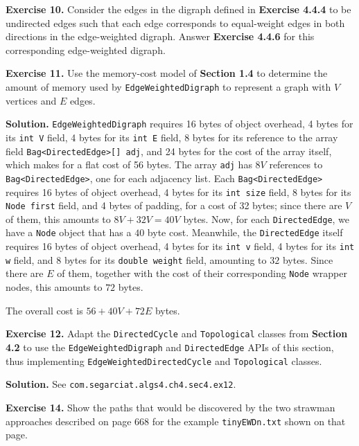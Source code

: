\documentclass[12pt, a4paper]{article}
\newenvironment{ex}[2][Exercise]
{\par\medskip\noindent \textbf{#1 #2.}}
{\medskip}
\newenvironment{sol}[1][Solution]
{\par\medskip\noindent \textbf{#1.} }
{\medskip}
\begin{document}
	\begin{ex}{10}
		Consider the edges in the digraph defined in \textbf{Exercise 4.4.4} to be undirected
		edges such that each edge corresponds to equal-weight edges in both directions
		in the edge-weighted digraph. Answer \textbf{Exercise 4.4.6} for this corresponding
		edge-weighted digraph.
	\end{ex}
	\begin{ex}{11}
		Use the memory-cost model of \textbf{Section 1.4} to determine the amount of memory
		used by \texttt{EdgeWeightedDigraph} to represent a graph with $V$ vertices and
		$E$ edges.
	\end{ex}
	\begin{sol}
		\texttt{EdgeWeightedDigraph} requires 16 bytes of object overhead, 4 bytes
		for its \texttt{int V} field, 4 bytes for its \texttt{int E} field,
		8 bytes for its reference to the array field \texttt{Bag<DirectedEdge>[] adj},
		and 24 bytes for the cost of the array itself, which makes for a flat cost of 56 bytes.
		The array \texttt{adj} has $8V$ references to \texttt{Bag<DirectedEdge>}, one for each
		adjacency list. Each \texttt{Bag<DirectedEdge>} requires 16 bytes of object
		overhead, 4 bytes for its \texttt{int size} field, 8 bytes for its \texttt{Node first}
		field, and 4 bytes of padding, for a cost of 32 bytes; since there are $V$ of them,
		this amounts to $8V+32V=40V$ bytes. Now, for each \texttt{DirectedEdge}, we have
		a \texttt{Node} object that has a $40$ byte cost. Meanwhile, the \texttt{DirectedEdge}
		itself requires 16 bytes of object overhead, 4 bytes for its \texttt{int v} field,
		4 bytes for its \texttt{int w} field, and 8 bytes for its \texttt{double weight}
		field, amounting to $32$ bytes. Since there are $E$ of them, together with the cost
		of their corresponding \texttt{Node} wrapper nodes, this amounts to $72$ bytes.
		
		The overall cost is $56+40V+72E$ bytes.
	\end{sol}
	\begin{ex}{12}
		Adapt the \texttt{DirectedCycle} and \texttt{Topological} classes from \textbf{Section 4.2}
		to use the \texttt{EdgeWeightedDigraph} and \texttt{DirectedEdge} APIs of this
		section, thus implementing \texttt{EdgeWeightedDirectedCycle} and \texttt{Topological}
		classes.
	\end{ex}
	\begin{sol}
		See \texttt{com.segarciat.algs4.ch4.sec4.ex12}.
	\end{sol}
	\begin{ex}{14}
		Show the paths that would be discovered by the two strawman approaches described
		on page 668 for the example \texttt{tinyEWDn.txt} shown on that page.
	\end{ex}
\end{document}
